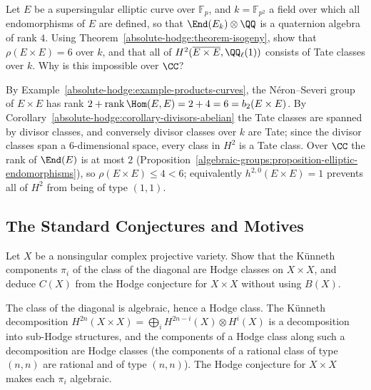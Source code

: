 \begin{exercise}\label{absolute-hodge:exercise-supersingular}
Let $E$ be a supersingular elliptic curve over $\mathbb{F}_p$, and $k = \mathbb{F}_{p^2}$ a field over which all endomorphisms of $E$ are defined, so that $\End(E_k) \otimes \QQ$ is a quaternion algebra of rank $4$. Using
Theorem~\ref{absolute-hodge:theorem-isogeny}, show that $\rho(E \times E) = 6$ over $k$, and that all of $H^2(\overline{E \times E}, \QQ_\ell(1))$ consists of Tate classes over $k$. Why is this impossible over $\CC$?
\end{exercise}

\begin{solution}
By Example~\ref{absolute-hodge:example-products-curves}, the N\'eron--Severi group of $E \times E$ has rank $2 + \operatorname{rank}\Hom(E, E) = 2 + 4 = 6 = b_2(E \times E)$. By Corollary~\ref{absolute-hodge:corollary-divisors-abelian} the
Tate classes are spanned by divisor classes, and conversely divisor classes over $k$ are Tate; since the divisor classes span a $6$-dimensional space, every class in $H^2$ is a Tate class. Over $\CC$ the rank of
$\End(E)$ is at most $2$ (Proposition~\ref{algebraic-groups:proposition-elliptic-endomorphisms}), so $\rho(E \times E) \leq 4 < 6$; equivalently $h^{2,0}(E \times E) = 1$ prevents all of $H^2$ from being of type $(1,1)$.
\end{solution}

\subsection{The Standard Conjectures and Motives}\label{absolute-hodge:subsection-exercises-standard-conjectures}

\begin{exercise}\label{absolute-hodge:exercise-kunneth-hodge}
Let $X$ be a nonsingular complex projective variety. Show that the K\"unneth components $\pi_i$ of the class of the diagonal are Hodge classes on $X \times X$, and deduce $C(X)$ from the Hodge conjecture
for $X \times X$ without using $B(X)$.
\end{exercise}

\begin{solution}
The class of the diagonal is algebraic, hence a Hodge class. The K\"unneth decomposition $H^{2n}(X \times X) = \bigoplus_iH^{2n-i}(X) \otimes H^i(X)$ is a decomposition into sub-Hodge structures, and the components
of a Hodge class along such a decomposition are Hodge classes (the components of a rational class of type $(n,n)$ are rational and of type $(n,n)$). The Hodge conjecture for $X \times X$ makes each $\pi_i$
algebraic.
\end{solution}


